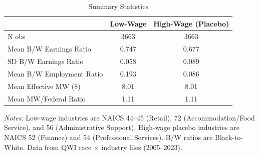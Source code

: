 \begin{table}[!htbp]
\centering
\caption{Summary Statistics}
\label{tab:summary}
\begin{threeparttable}
\begin{tabular}{lcc}
\toprule
 & Low-Wage & High-Wage (Placebo) \\
\midrule
N obs & 3663 & 3663 \\
Mean B/W Earnings Ratio & 0.747 & 0.677 \\
SD B/W Earnings Ratio & 0.058 & 0.089 \\
Mean B/W Employment Ratio & 0.193 & 0.086 \\
Mean Effective MW (\$) & 8.01 & 8.01 \\
Mean MW/Federal Ratio & 1.11 & 1.11 \\
\bottomrule
\end{tabular}
\begin{tablenotes}[flushleft]
\small
\item \textit{Notes:} Low-wage industries are NAICS 44--45 (Retail), 72 (Accommodation/Food Service), and 56 (Administrative Support). High-wage placebo industries are NAICS 52 (Finance) and 54 (Professional Services). B/W ratios are Black-to-White. Data from QWI race $\times$ industry files (2005--2023).
\end{tablenotes}
\end{threeparttable}
\end{table}
